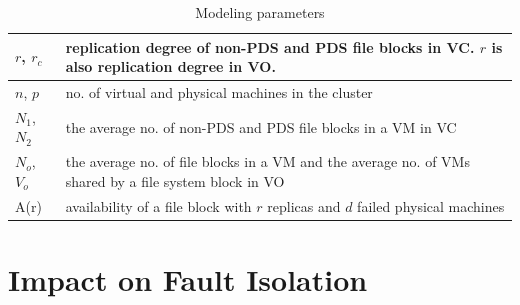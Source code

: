 \begin{table}[t]\small
\centering
\tabcolsep=0.11cm
\begin{tabular}{|p{1.0cm}|p{5.75cm}|}
\hline
$r$, $r_c$ & replication degree of non-PDS and PDS file blocks in VC. $r$ is also replication degree in VO.\\
\hline
$n$, $p$ & no. of virtual and physical machines in the cluster\\
\hline
$N_1$, $N_2$ & the average no.  of non-PDS and PDS file blocks in a VM in VC\\
\hline
$N_o$, $V_o$ & the average no.  of file blocks  in a VM and the average no. of VMs shared by a file system block in VO\\
\hline
A(r) & availability of a file block with $r$ replicas and $d$ failed physical machines\\
\hline
\end{tabular}
\caption{Modeling  parameters}
\label{tab:symbol}
\end{table}



\section{Impact on Fault Isolation}
 
